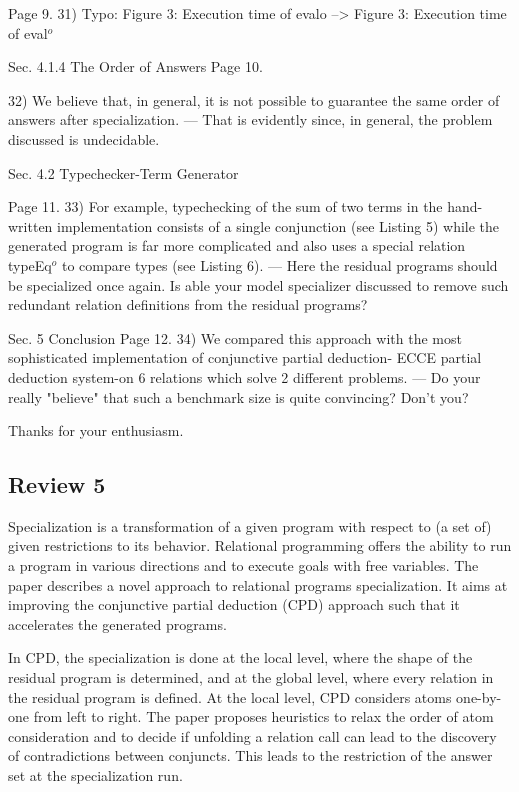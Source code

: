 Page 9.
31) Typo:
  Figure 3: Execution time of evalo --> Figure 3: Execution time of eval$^o$

Sec. 4.1.4 The Order of Answers
Page 10.

32) We believe that, in general, it is not possible to guarantee the same order of answers after specialization.
 --- That is evidently since, in general, the problem discussed is undecidable.

Sec. 4.2 Typechecker-Term Generator

Page 11.
33) For example, typechecking of the sum of two terms in the hand-written implementation consists of a single conjunction (see Listing 5) while the generated program is far more complicated and also uses a special relation typeEq$^o$ to compare types (see Listing 6).
 --- Here the residual programs should be specialized once again. Is able your model specializer discussed to remove such redundant relation definitions from the residual programs?

Sec. 5 Conclusion
Page 12.
34) We compared this approach with the most sophisticated implementation of conjunctive partial deduction- ECCE partial deduction system-on 6 relations which solve 2 different problems.
 --- Do your really "believe" that such a benchmark size is quite convincing? Don't you?

Thanks for your enthusiasm.

\subsection*{Review 5}

Specialization is a transformation of a given program with respect to (a set of) given restrictions to its behavior. Relational programming offers the ability to run a program in various directions and to execute goals with free variables. The paper describes a novel approach to relational programs specialization. It aims at improving the conjunctive partial deduction (CPD) approach such that it accelerates the generated programs.

In CPD, the specialization is done at the local level, where the shape of the residual program is determined, and at the global level, where every relation in the residual program is defined. At the local level, CPD considers atoms one-by-one from left to right. The paper proposes heuristics to relax the order of atom consideration and to decide if unfolding a relation call can lead to the discovery of contradictions between conjuncts. This leads to the restriction of the answer set at the specialization run.

